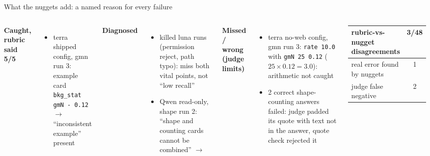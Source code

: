 \begin{frame}{What the nuggets add: a named reason for every failure}
  \vspace{2pt}
  \begin{columns}[T]
    \textbf{Caught, rubric said 5/5}
    \small
    \begin{itemize}
      \item terra shipped config, gmn run 3: example card\\
        \texttt{bkg\_stat gmN - 0.12} \\
        $\to$  ``inconsistent example'' present
    \end{itemize}
    \textbf{Diagnosed}
    \begin{itemize}
      \item killed luna runs (permission reject, path typo): miss both vital points, not ``low recall''
      \item Qwen read-only, shape run 2: ``shape and counting cards cannot be combined'' $\to$ 
    \end{itemize}
    \textbf{Missed / wrong (judge limits)}
    \small
    \begin{itemize}
      \item terra no-web config, gmn run 3: \texttt{rate 10.0} with \texttt{gmN 25 0.12} ($25\times0.12=3.0$): arithmetic not caught
      \item 2 correct shape-counting answers failed: judge padded its quote with text not in the answer, quote check rejected it
    \end{itemize}
    \vspace{4pt}
    \begin{center}
    \begin{tabular}{lc}
      \toprule
      rubric-vs-nugget disagreements & 3/48 \\
      \midrule
      real error found by nuggets & 1 \\
      judge false negative & 2 \\
      \bottomrule
    \end{tabular}
    \end{center}
  \end{columns}
\end{frame}

